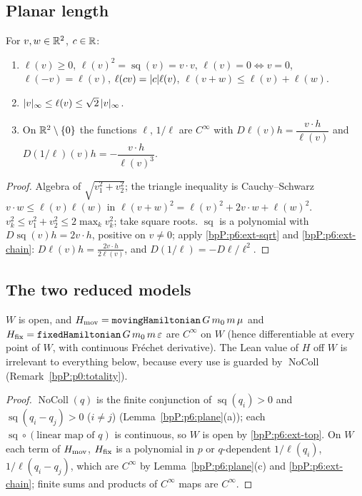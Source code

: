\subsection{Planar length}\label{bpP:p6:planar}

\begin{lemma}\label{bpP:p6:plane}
For $v,w\in\mathbb{R}^2$, $c\in\mathbb{R}$:
\begin{enumerate}[label=(\alph*)]
\item $\ell(v)\ge0$, $\ell(v)^2=\operatorname{sq}(v)=v\cdot v$, $\ell(v)=0\iff v=0$, $\ell(-v)=\ell(v)$, $\ell(cv)=\lvert c\rvert\ell(v)$, $\ell(v+w)\le\ell(v)+\ell(w)$.
\item $\lvert v\rvert_\infty\le\ell(v)\le\sqrt2\,\lvert v\rvert_\infty$.
\item On $\mathbb{R}^2\setminus\{0\}$ the functions $\ell$, $1/\ell$ are $C^\infty$ with $D\ell(v)h=\dfrac{v\cdot h}{\ell(v)}$ and $D(1/\ell)(v)h=-\dfrac{v\cdot h}{\ell(v)^3}$.
\end{enumerate}
\end{lemma}
\begin{proof}
\label{stepP:p6:pl-a} Algebra of $\sqrt{v_1^2+v_2^2}$; the triangle inequality is Cauchy--Schwarz $v\cdot w\le\ell(v)\ell(w)$ in $\ell(v+w)^2=\ell(v)^2+2v\cdot w+\ell(w)^2$.
\label{stepP:p6:pl-b} $v_k^2\le v_1^2+v_2^2\le2\max_kv_k^2$; take square roots.
\label{stepP:p6:pl-c} $\operatorname{sq}$ is a polynomial with $D\operatorname{sq}(v)h=2v\cdot h$, positive on $v\ne0$; apply \ref{bpP:p6:ext-sqrt} and \ref{bpP:p6:ext-chain}: $D\ell(v)h=\frac{2v\cdot h}{2\ell(v)}$, and $D(1/\ell)=-D\ell/\ell^2$.
\end{proof}

\subsection{The two reduced models}\label{bpP:p6:models}

\begin{lemma}\label{bpP:p6:domain}
$W$ is open, and $H_{\rm mov}=\texttt{movingHamiltonian}\,G\,m_0\,m\,\mu$ and $H_{\rm fix}=\texttt{fixedHamiltonian}\,G\,m_0\,m\,\varepsilon$ are $C^\infty$ on $W$ (hence differentiable at every point of $W$, with continuous Fr\'echet derivative). The Lean value of $H$ off $W$ is irrelevant to everything below, because every use is guarded by $\operatorname{NoColl}$ (Remark~\ref{bpP:p0:totality}).
\end{lemma}
\begin{proof}
\label{stepP:p6:dom-open} $\operatorname{NoColl}(q)$ is the finite conjunction of $\operatorname{sq}(q_i)>0$ and $\operatorname{sq}(q_i-q_j)>0$ ($i\ne j$) (Lemma~\ref{bpP:p6:plane}(a)); each $\operatorname{sq}\circ(\text{linear map of }q)$ is continuous, so $W$ is open by \ref{bpP:p6:ext-top}.
\label{stepP:p6:dom-smooth} On $W$ each term of $H_{\rm mov}$, $H_{\rm fix}$ is a polynomial in $p$ or $q$-dependent $1/\ell(q_i)$, $1/\ell(q_i-q_j)$, which are $C^\infty$ by Lemma~\ref{bpP:p6:plane}(c) and \ref{bpP:p6:ext-chain}; finite sums and products of $C^\infty$ maps are $C^\infty$.
\end{proof}

